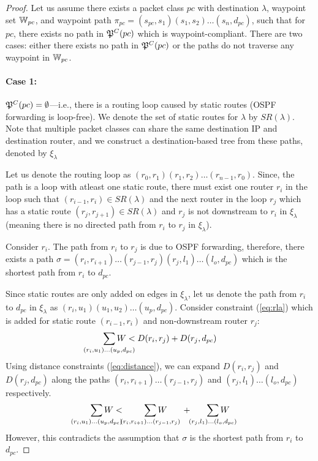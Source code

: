 \begin{proof}
	Let us assume there exists a packet class $pc$ 
	with destination $\lambda$, 
	waypoint set $\mathbb{W}_{pc}$,
	and waypoint path $\pi_{pc} = (s_{pc}, s_1)(s_1, s_2)\ldots (s_n, d_{pc})$, 
	such that for $pc$, 
	there exists no path in $\mathfrak{P}^C(pc)$
	which is waypoint-compliant. There are two
	cases: either there exists no path in $\mathfrak{P}^C(pc)$ 
	or the paths do not traverse any waypoint in $\mathbb{W}_{pc}$.

	\paragraph{Case 1:} $\mathfrak{P}^C(pc) = \emptyset$---i.e., there
	is a routing loop caused by static routes (OSPF forwarding
	is loop-free).
	We denote the set of static routes for $\lambda$ by $SR(\lambda)$. Note that
	multiple packet classes can share the same destination IP
	and destination router, and we 
	construct a destination-based tree from these paths, denoted by 
	$\xi_\lambda$ 

	Let us denote the routing loop as 
	$(r_0, r_1) (r_1, r_2) \ldots (r_{n-1}, r_0)$.
	Since, the path is a loop with atleast one static route,
	there must exist one router $r_i$ in the loop
	such that $(r_{i-1}, r_i) \in SR(\lambda)$ and the
	next router in the loop $r_j$ which has a static route
	$(r_j, r_{j+1}) \in SR(\lambda)$ and $r_j$ is not downstream
	to $r_i$ in $\xi_\lambda$ (meaning there is no directed path 
	from $r_i$ to $r_j$ in $\xi_\lambda$). 

	Consider $r_i$. The path from $r_i$ to $r_j$ is 
	due to OSPF forwarding, therefore, there exists a 
	path $\sigma =
	(r_i, r_{i+1})\ldots(r_{j-1}, r_j)(r_j, l_1) \ldots (l_{o}, d_{pc})$
	which is the shortest path  from $r_i$ to $d_{pc}$. 

	Since static routes are only added on edges in $\xi_\lambda$, 
	let us denote the path from $r_{i}$ to $d_{pc}$ in 
	$\xi_\lambda$ as $(r_{i}, u_1)(u_1, u_2)\ldots(u_p, d_{pc})$. 
	Consider constraint (\ref{eq:rla}) which is added for static route 
	$(r_{i-1}, r_i)$ and non-downstream router $r_j$:
	\[
	\sum_{\mathclap{\substack{(r_{i}, u_1)\ldots(u_p, d_{pc})}}} 
	W < D(r_i, r_j) + D(r_j, d_{pc}) 
	\]
	Using distance constraints (\ref{eq:distance}), we can expand 
	$D(r_i, r_j)$ and $D(r_j, d_{pc})$ along the paths 
	$(r_i, r_{i+1})\ldots(r_{j-1}, r_j)$ and $(r_j, l_1) \ldots (l_{o}, d_{pc})$
	respectively. 
	\[
	\sum_{\mathclap{\substack{(r_{i}, u_1)\ldots(u_p, d_{pc})}}} 
	W < \hspace{0.8cm} \sum_{\mathclap{\substack{(r_i, r_{i+1})\ldots(r_{j-1}, r_j)}}}W \hspace{0.6cm} + 
	\hspace{0.6cm} \sum_{\mathclap{\substack{(r_j, l_1) \ldots (l_{o}, d_{pc})}}}W  
	\]
	However, this contradicts the assumption that $\sigma$ is 
	the shortest path from $r_i$ to $d_{pc}$. 


\end{proof}
